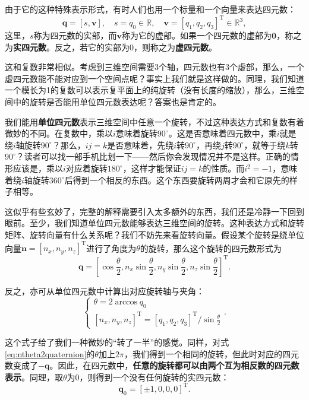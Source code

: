 由于它的这种特殊表示形式，有时人们也用一个标量和一个向量来表达四元数：
\[
 \bm{q} = \left[ s, \bm{v} \right], \quad s=q_0 \in \mathbb{R},\quad \bm{v} = [q_1, q_2, q_3]^\mathrm{T} \in \mathbb{R}^3,
\]
这里，$s$称为四元数的实部，而$\bm{v}$称为它的虚部。如果一个四元数的虚部为$\bm{0}$，称之为\textbf{实四元数}。反之，若它的实部为$0$，则称之为\textbf{虚四元数}。

这和复数非常相似。考虑到三维空间需要3个轴，四元数也有3个虚部，那么，一个虚四元数能不能对应到一个空间点呢？事实上我们就是这样做的。同理，我们知道一个模长为1的复数可以表示复平面上的纯旋转（没有长度的缩放），那么，三维空间中的旋转是否能用单位四元数表达呢？答案也是肯定的。

我们能用\textbf{单位四元数}表示三维空间中任意一个旋转，不过这种表达方式和复数有着微妙的不同。在复数中，乘以$i$意味着旋转$90^\circ$。这是否意味着四元数中，乘$i$就是绕$i$轴旋转$90^\circ$？那么，$ij=k$是否意味着，先绕$i$转$90^\circ$，再绕$j$转$90^\circ$，就等于绕$k$转$90^\circ$？读者可以找一部手机比划一下——然后你会发现情况并不是这样。正确的情形应该是，乘以$i$对应着旋转$180^\circ$，这样才能保证$ij=k$的性质。而$i^2=-1$，意味着绕$i$轴旋转$360^\circ$后得到一个相反的东西。这个东西要旋转两周才会和它原先的样子相等。

这似乎有些玄妙了，完整的解释需要引入太多额外的东西，我们还是冷静一下回到眼前。至少，我们知道单位四元数能够表达三维空间的旋转。这种表达方式和旋转矩阵、旋转向量有什么关系呢？我们不妨先来看旋转向量。假设某个旋转是绕单位向量$\bm{n}=\left[ n_x, n_y, n_z \right]^\mathrm{T}$进行了角度为$\theta$的旋转，那么这个旋转的四元数形式为
\begin{equation}
\label{eq:ntheta2quaternion}
\bm{q} = \left[ \cos \frac{\theta}{2}, n_x \sin \frac{\theta}{2}, n_y \sin \frac{\theta}{2}, n_z \sin \frac{\theta}{2}\right]^\mathrm{T} .
\end{equation}

反之，亦可从单位四元数中计算出对应旋转轴与夹角：
\begin{equation}
\label{eq:rotationVector2Quaternion}
\begin{cases}
\theta  = 2\arccos {q_0}\\
{\left[ {{n_x},{n_y},{n_z}} \right]^\mathrm{T}} = {{{\left[ {{q_1},{q_2},{q_3}} \right]}^\mathrm{T}}}/{\sin \frac{\theta }{2}}
\end{cases} .
\end{equation}

\clearpage
这个式子给了我们一种微妙的“转了一半”的感觉。同样，对式\eqref{eq:ntheta2quaternion}的$\theta$加上$2\pi$，我们得到一个相同的旋转，但此时对应的四元数变成了$-\bm{q}$。因此，在四元数中，\textbf{任意的旋转都可以由两个互为相反数的四元数表示}。同理，取$\theta$为$0$，则得到一个没有任何旋转的实四元数：
\begin{equation}
\bm{q}_0 = \left[ { \pm 1,0,0,0} \right]^\mathrm{T} .
\end{equation}


